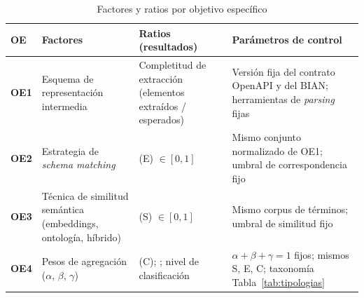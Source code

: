 \begin{table}[H]
  \centering
  \caption{Factores y ratios por objetivo específico}
  \label{tab:variables}
  \small
  \begin{tabular}{@{}p{}p{}p{}p{}@{}}
    \toprule
    \textbf{OE} & \textbf{Factores} & \textbf{Ratios (resultados)} & \textbf{Parámetros de control} \\
    \midrule
    \textbf{OE1} &
    Esquema de representación intermedia &
    Completitud de extracción (elementos extraídos / esperados) &
    Versión fija del contrato OpenAPI y del \ServiceDomain{} BIAN; herramientas de \textit{parsing} fijas \\
    \textbf{OE2} &
    Estrategia de \textit{schema matching} &
    \StructuralScore{} (E) $\in [0, 1]$ &
    Mismo conjunto normalizado de OE1; umbral de correspondencia fijo \\
    \textbf{OE3} &
    Técnica de similitud semántica (embeddings, ontología, híbrido) &
    \SemanticScore{} (S) $\in [0, 1]$ &
    Mismo corpus de términos; umbral de similitud fijo \\
    \textbf{OE4} &
    Pesos de agregación ($\alpha$, $\beta$, $\gamma$) &
    \CoverageScore{} (C); \AlignmentScore{}; nivel de clasificación &
    $\alpha + \beta + \gamma = 1$ fijos; mismos S, E, C; taxonomía Tabla~\ref{tab:tipologias} \\
    \bottomrule
  \end{tabular}
\end{table}
